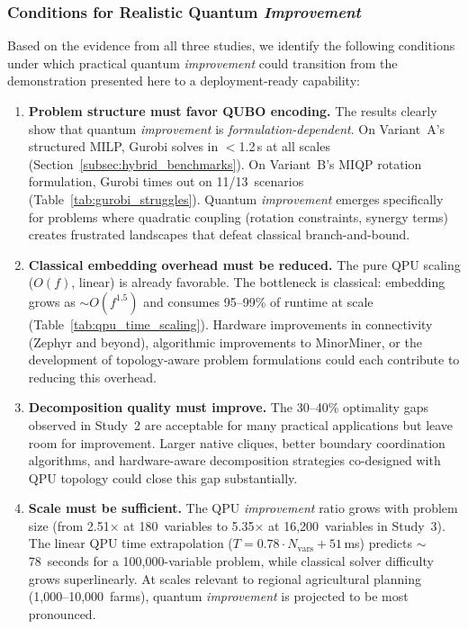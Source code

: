 \subsubsection{Conditions for Realistic Quantum \textit{Improvement}}

Based on the evidence from all three studies, we identify the following conditions under which practical quantum \textit{improvement} could transition from the demonstration presented here to a deployment-ready capability:

\begin{enumerate}
    \item \textbf{Problem structure must favor QUBO encoding.} The results clearly show that quantum \textit{improvement} is \textit{formulation-dependent}. On Variant~A's structured MILP, Gurobi solves in $<$1.2\,s at all scales (Section~\ref{subsec:hybrid_benchmarks}). On Variant~B's MIQP rotation formulation, Gurobi times out on 11/13~scenarios (Table~\ref{tab:gurobi_struggles}). Quantum \textit{improvement} emerges specifically for problems where quadratic coupling (rotation constraints, synergy terms) creates frustrated landscapes that defeat classical branch-and-bound.
    
    \item \textbf{Classical embedding overhead must be reduced.} The pure QPU scaling ($O(f)$, linear) is already favorable. The bottleneck is classical: embedding grows as $\sim O(f^{1.5})$ and consumes 95--99\% of runtime at scale (Table~\ref{tab:qpu_time_scaling}). Hardware improvements in connectivity (Zephyr and beyond), algorithmic improvements to MinorMiner, or the development of topology-aware problem formulations could each contribute to reducing this overhead.
    
    \item \textbf{Decomposition quality must improve.} The 30--40\% optimality gaps observed in Study~2 are acceptable for many practical applications but leave room for improvement. Larger native cliques, better boundary coordination algorithms, and hardware-aware decomposition strategies co-designed with QPU topology could close this gap substantially.
    
    \item \textbf{Scale must be sufficient.} The QPU \textit{improvement} ratio grows with problem size (from 2.51$\times$ at 180~variables to 5.35$\times$ at 16,200~variables in Study~3). The linear QPU time extrapolation ($T = 0.78 \cdot N_{\text{vars}} + 51$\,ms) predicts $\sim$78~seconds for a 100,000-variable problem, while classical solver difficulty grows superlinearly. At scales relevant to regional agricultural planning (1,000--10,000~farms), quantum \textit{improvement} is projected to be most pronounced.
\end{enumerate}

